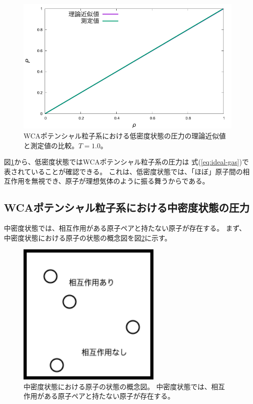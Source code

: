\documentclass[titlepage]{jsreport}
\begin{document}
{{{\begin{figure}[htbp]
    \begin{center}
        \includegraphics[width=14cm]{fig/lowden_compare:den-pre.pdf}
    \end{center}
    \caption{WCAポテンシャル粒子系における低密度状態の圧力の理論近似値と測定値の比較。$T=1.0$。}
    \label{fig:lowden_compare:den-pre}
\end{figure}

図\ref{fig:lowden_compare:den-pre}から、低密度状態ではWCAポテンシャル粒子系の圧力は
式(\ref{eq:ideal-gas})で表されていることが確認できる。
これは、低密度状態では、「ほぼ」原子間の相互作用を無視でき、原子が理想気体のように振る舞うからである。


\newpage
\subsection{WCAポテンシャル粒子系における中密度状態の圧力}\label{results-subsec:WCA-press-middle-density}
中密度状態では、相互作用がある原子ペアと持たない原子が存在する。
まず、中密度状態における原子の状態の概念図を図\ref{fig:middledensity.png}に示す。

\begin{figure}[htbp]
    \begin{center}
        \includegraphics[width=7cm]{fig/middledensity.png}
    \end{center}
    \caption{中密度状態における原子の状態の概念図。
    中密度状態では、相互作用がある原子ペアと持たない原子が存在する。}
    \label{fig:middledensity.png}
\end{figure}

}}}
\end{document}
